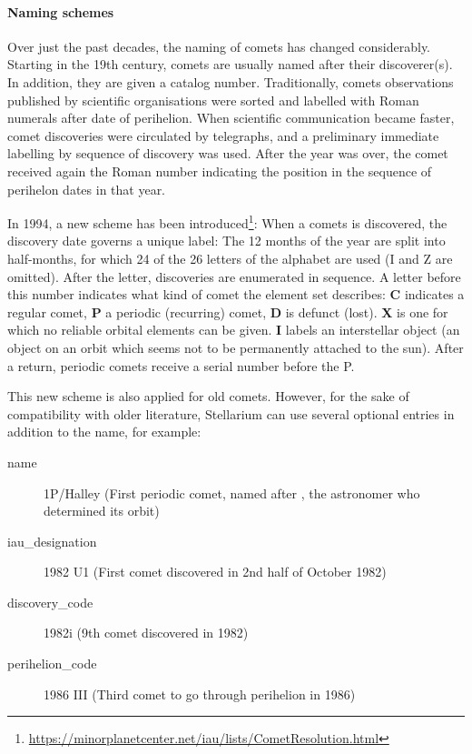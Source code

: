 \paragraph{Naming schemes}
Over just the past decades, the naming of comets has changed considerably. 
Starting in the 19th century, comets are usually named after their discoverer(s). 
In addition, they are given a catalog number. 
Traditionally, comets observations published by scientific organisations were sorted and labelled with Roman numerals after date of perihelion. 
When scientific communication became faster, comet discoveries were circulated by telegraphs, and a preliminary immediate labelling by sequence of discovery was used. 
After the year was over, the comet received again the Roman number indicating the position in the sequence of perihelon dates in that year. 

In 1994, a new scheme has been introduced\footnote{\url{https://minorplanetcenter.net/iau/lists/CometResolution.html}}: 
When a comets is discovered, the discovery date governs a unique label: 
The 12 months of the year are split into half-months, for which 24 of the 26 letters of the alphabet are used (I and Z are omitted). 
After the letter, discoveries are enumerated in sequence. 
A letter before this number indicates what kind of comet the element set describes: \textbf{C} indicates a regular comet, 
\textbf{P} a periodic (recurring) comet, \textbf{D} is defunct (lost). \textbf{X} is one for which no reliable orbital elements can be given. 
\textbf{I} labels an interstellar object (an object on an orbit which seems not to be permanently attached to the sun).
After a return, periodic comets receive a serial number before the P.

This new scheme is also applied for old comets. However, for the sake of compatibility with older literature, 
Stellarium can use several optional entries in addition to the name, for example:
\begin{description}
\item[name] 1P/Halley (First periodic comet, named after , the astronomer who determined its orbit)
\item[iau\_designation] 1982 U1 (First comet discovered in 2nd half of October 1982)
\item[discovery\_code] 1982i (9th comet discovered in 1982)
\item[perihelion\_code] 1986 III (Third comet to go through perihelion in 1986)
\end{description}



